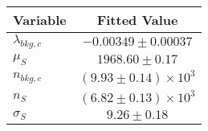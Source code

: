\begin{tabular}[t]{lc}
\hline
Variable &Fitted Value\\
\hline\hline
$\lambda_{bkg,c}$&$-0.00349\pm0.00037$\\
\hline
$\mu_{S}$&$1968.60\pm0.17$\\
\hline
$n_{bkg,c}$&$(9.93\pm0.14)\times 10^3$\\
\hline
$n_{S}$&$(6.82\pm0.13)\times 10^3$\\
\hline
$\sigma_{S}$&$9.26\pm0.18$\\
\hline
\end{tabular}